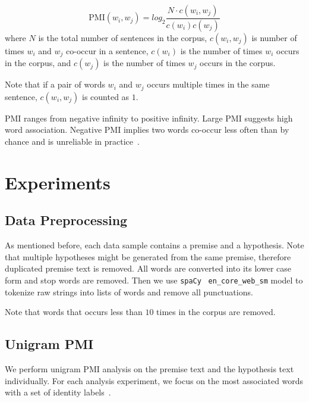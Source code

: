 \documentclass[11pt]{article}
\begin{document}
    \[
        \text{PMI}(w_i, w_j) = log_2\frac{N\cdot c(w_i, w_j)}{c(w_i)c(w_j)}
    \]
    where $N$ is the total number of sentences in the corpus,
    $c(w_i,w_j)$ is number of times $w_i$ and $w_j$ co-occur in a sentence,
    $c(w_i)$ is the number of times $w_i$ occurs in the corpus,
    and $c(w_j)$ is the number of times $w_j$ occurs in the corpus.

    Note that if a pair of words $w_i$ and $w_j$ occurs multiple times in the same sentence, $c(w_i,w_j)$ is counted
    as $1$.

    PMI ranges from negative infinity to positive infinity.
    Large PMI suggests high word association.
    Negative PMI implies two words co-occur less often than by chance and is unreliable in
    practice~\cite{speech_and_nlp_book}.


    \section{Experiments}

    \subsection{Data Preprocessing}

    As mentioned before, each data sample contains a premise and a hypothesis.
    Note that multiple hypotheses might be generated from the same premise, therefore duplicated premise text is
    removed.
    All words are converted into its lower case form and stop words are removed.
    Then we use \texttt{spaCy}~\cite{spacy} \texttt{en\_core\_web\_sm} model to tokenize raw strings into
    lists of words and remove all punctuations.

    Note that words that occurs less than $10$ times in the corpus are removed.

    \subsection{Unigram PMI}

    We perform unigram PMI analysis on the premise text and the hypothesis text individually.
    For each analysis experiment, we focus on the most associated words with a set of
    identity labels~\cite{identity_labels}.
\end{document}

